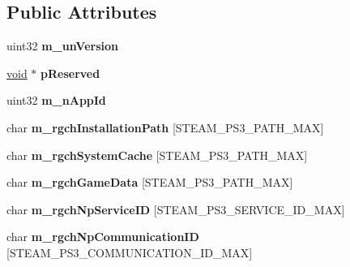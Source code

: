 \subsection*{Public Attributes}
\begin{DoxyCompactItemize}
\item 
\hypertarget{structSteamPS3Params__t_a15a6d4166ce90eb0a89d2546ed312cfb}{}uint32 {\bfseries m\+\_\+un\+Version}\label{structSteamPS3Params__t_a15a6d4166ce90eb0a89d2546ed312cfb}

\item 
\hypertarget{structSteamPS3Params__t_a2d53ce486deae5e375a875c7f0877e34}{}\hyperlink{SDL__audio_8h_a52835ae37c4bb905b903cbaf5d04b05f}{void} $\ast$ {\bfseries p\+Reserved}\label{structSteamPS3Params__t_a2d53ce486deae5e375a875c7f0877e34}

\item 
\hypertarget{structSteamPS3Params__t_a3f4110f89eb639d80fa3aeb3eb7738b8}{}uint32 {\bfseries m\+\_\+n\+App\+Id}\label{structSteamPS3Params__t_a3f4110f89eb639d80fa3aeb3eb7738b8}

\item 
\hypertarget{structSteamPS3Params__t_a51b57ab78e10283c2d06e23da228943f}{}char {\bfseries m\+\_\+rgch\+Installation\+Path} \mbox{[}S\+T\+E\+A\+M\+\_\+\+P\+S3\+\_\+\+P\+A\+T\+H\+\_\+\+M\+A\+X\mbox{]}\label{structSteamPS3Params__t_a51b57ab78e10283c2d06e23da228943f}

\item 
\hypertarget{structSteamPS3Params__t_aa1181e13d76363a2ecc54d1f2c3fbc5c}{}char {\bfseries m\+\_\+rgch\+System\+Cache} \mbox{[}S\+T\+E\+A\+M\+\_\+\+P\+S3\+\_\+\+P\+A\+T\+H\+\_\+\+M\+A\+X\mbox{]}\label{structSteamPS3Params__t_aa1181e13d76363a2ecc54d1f2c3fbc5c}

\item 
\hypertarget{structSteamPS3Params__t_ad5cb897cb73e58157f45399c7283711b}{}char {\bfseries m\+\_\+rgch\+Game\+Data} \mbox{[}S\+T\+E\+A\+M\+\_\+\+P\+S3\+\_\+\+P\+A\+T\+H\+\_\+\+M\+A\+X\mbox{]}\label{structSteamPS3Params__t_ad5cb897cb73e58157f45399c7283711b}

\item 
\hypertarget{structSteamPS3Params__t_ad24d2672a57be2e3657f1e779a146538}{}char {\bfseries m\+\_\+rgch\+Np\+Service\+I\+D} \mbox{[}S\+T\+E\+A\+M\+\_\+\+P\+S3\+\_\+\+S\+E\+R\+V\+I\+C\+E\+\_\+\+I\+D\+\_\+\+M\+A\+X\mbox{]}\label{structSteamPS3Params__t_ad24d2672a57be2e3657f1e779a146538}

\item 
\hypertarget{structSteamPS3Params__t_a3b2258d9055e84fca373b0675f8caffa}{}char {\bfseries m\+\_\+rgch\+Np\+Communication\+I\+D} \mbox{[}S\+T\+E\+A\+M\+\_\+\+P\+S3\+\_\+\+C\+O\+M\+M\+U\+N\+I\+C\+A\+T\+I\+O\+N\+\_\+\+I\+D\+\_\+\+M\+A\+X\mbox{]}\label{structSteamPS3Params__t_a3b2258d9055e84fca373b0675f8caffa}


\end{DoxyCompactItemize}
